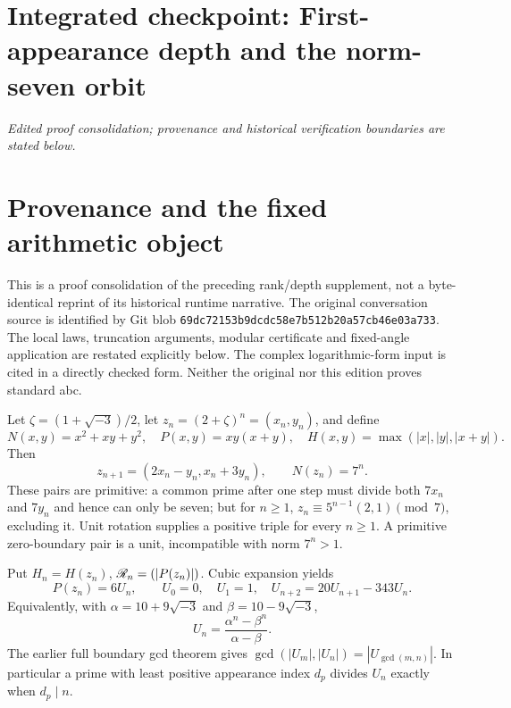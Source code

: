 \clearpage
\begingroup
\let\Z\relax
\newcommand{\Z}{\mathbb Z}
\let\N\relax
\newcommand{\N}{\mathbb N}
\let\rad\relax
\newcommand{\rad}{\operatorname{rad}}
\let\eps\relax
\newcommand{\eps}{\varepsilon}
\section*{Integrated checkpoint: First-appearance depth and the norm-seven orbit}
\label{checkpoint:rank}
\noindent\textit{Edited proof consolidation; provenance and historical verification boundaries are stated below.}\medskip

\section{Provenance and the fixed arithmetic object}
This is a proof consolidation of the preceding rank/depth supplement, not a byte-identical reprint of its historical runtime narrative. The original conversation source is identified by Git blob \texttt{69dc72153b9dcdc58e7b512b20a57cb46e03a733}. The local laws, truncation arguments, modular certificate and fixed-angle application are restated explicitly below. The complex logarithmic-form input is cited in a directly checked form. Neither the original nor this edition proves standard abc.

Let $\zeta=(1+\sqrt{-3})/2$, let $z_n=(2+\zeta)^n=(x_n,y_n)$, and define
\[
 N(x,y)=x^2+xy+y^2,\quad P(x,y)=xy(x+y),\quad H(x,y)=\max(|x|,|y|,|x+y|).
\]
Then
\[
 z_{n+1}=(2x_n-y_n,x_n+3y_n),\qquad N(z_n)=7^n.
\]
These pairs are primitive: a common prime after one step must divide both $7x_n$ and $7y_n$ and hence can only be seven; but for $n\ge1$, $z_n\equiv5^{n-1}(2,1)\pmod7$, excluding it. Unit rotation supplies a positive triple for every $n\ge1$. A primitive zero-boundary pair is a unit, incompatible with norm $7^n>1$.

Put $H_n=H(z_n)$, $\mathscr R_n=\rad(|P(z_n)|)$. Cubic expansion yields
\[
 P(z_n)=6U_n,\qquad U_0=0,\quad U_1=1,\quad U_{n+2}=20U_{n+1}-343U_n.
\]
Equivalently, with $\alpha=10+9\sqrt{-3}$ and $\beta=10-9\sqrt{-3}$,
\[
 U_n=\frac{\alpha^n-\beta^n}{\alpha-\beta}.
\]
The earlier full boundary gcd theorem gives $\gcd(|U_m|,|U_n|)=|U_{\gcd(m,n)}|$. In particular a prime with least positive appearance index $d_p$ divides $U_n$ exactly when $d_p\mid n$.

